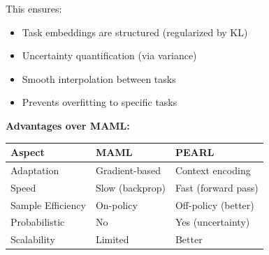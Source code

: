 \documentclass[12pt]{article}
\begin{document}
{{			This ensures:
			\begin{itemize}
				\item Task embeddings are structured (regularized by KL)
				\item Uncertainty quantification (via variance)
				\item Smooth interpolation between tasks
				\item Prevents overfitting to specific tasks
			\end{itemize}
			
			\textbf{Advantages over MAML:}
			
			\begin{center}
			\begin{tabular}{|l|l|l|}
			\hline
			\textbf{Aspect} & \textbf{MAML} & \textbf{PEARL} \\
			\hline
			Adaptation & Gradient-based & Context encoding \\
			Speed & Slow (backprop) & Fast (forward pass) \\
			Sample Efficiency & On-policy & Off-policy (better) \\
			Probabilistic & No & Yes (uncertainty) \\
			Scalability & Limited & Better \\
			\hline
			\end{tabular}
			\end{center}
			
	}}
	
	
	
	
	\newpage
	
\end{document}
